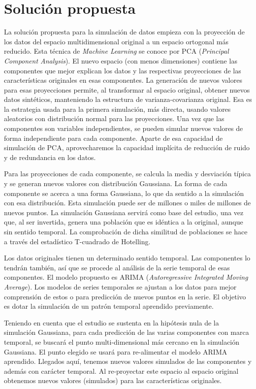 \documentclass[11pt,spanish,listoffigures,listoftables]{tfgetsinf}
\begin{document}
\chapter{Solución propuesta}
La solución propuesta para la simulación de datos empieza con la proyección de los datos del espacio multidimensional original a un espacio ortogonal más reducido. Esta técnica de {\em Machine Learning} se conoce por PCA ({\em Principal Component Analysis}). El nuevo espacio (con menos dimensiones) contiene las componentes que mejor explican los datos y las respectivas proyecciones de las características originales en esas componentes. La generación de nuevos valores para esas proyecciones permite, al transformar al espacio original, obtener nuevos datos sintéticos, manteniendo la estructura de varianza-covarianza original. Esa es la estrategia usada para la primera simulación, más directa, usando valores aleatorios con distribución normal para las proyecciones. Una vez que las componentes son variables independientes, se pueden simular nuevos valores de forma independiente para cada componente. Aparte de esa capacidad de simulación de PCA, aprovecharemos la capacidad implícita de reducción de ruido y de redundancia en los datos.

Para las proyecciones de cada componente, se calcula la media y desviación típica y se generan nuevos valores con distribución Gaussiana. La forma de cada componente se acerca a una forma Gaussiana, lo que da sentido a la simulación con esa distribución. Esta simulación puede ser de millones o miles de millones de nuevos puntos. La simulación Gaussiana servirá como base del estudio, una vez que, al ser invertida, genera una población que es idéntica a la original, aunque sin sentido temporal. La comprobación de dicha similitud de poblaciones se hace a través del estadístico T-cuadrado de Hotelling. 

Los datos originales tienen un determinado sentido temporal. Las componentes lo tendrán también, así que se procede al análisis de la serie temporal de esas componentes. El modelo propuesto es ARIMA ({\em Autoregressive Integrated Moving Average}). Los modelos de series temporales se ajustan a los datos para mejor comprensión de estos o para predicción de nuevos puntos en la serie. El objetivo es dotar la simulación de un patrón temporal aprendido previamente.

Teniendo en cuenta que el estudio se sustenta en la hipótesis nula de la simulación Gaussiana, para cada predicción de las varias componentes con marca temporal, se buscará el punto multi-dimensional más cercano en la simulación Gaussiana. El punto elegido se usará para re-alimentar el modelo ARIMA aprendido. Llegados aquí, tenemos nuevos valores simulados de las componentes y además con carácter temporal. Al re-proyectar este espacio al espacio original obtenemos nuevos valores (simulados) para las características originales.
\end{document}
